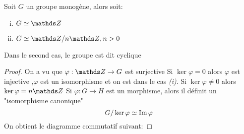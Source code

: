 	\begin{proposition}
		Soit $G$ un groupe monog\`ene, alors soit:
		\begin{enumerate}[(i)]
			\item	$G \simeq \Set{Z}$
			\item	$G \simeq \Set{Z} / n\Set{Z} , n > 0$
		\end{enumerate}
	\end{proposition}
	\begin{definition}
		Dans le second cas, le groupe est dit cyclique
	\end{definition}
	\begin{proof}
		On a vu que $\varphi : \Set{Z} \rightarrow G$ est surjective \newline
		Si $\ker \varphi = 0$ alors $\varphi$ est injective ,$\varphi$ est un isomorphisme et on est dans le cas \textit{(i)}. \newline
		Si $\ker \varphi \ne 0$ alors $\ker \varphi = n\Set{Z}$ \newline
		 \newline
		 Si $\varphi : G \rightarrow H$ est un morphisme, alors il d\'efinit un "isomorphisme canonique"
		\[ G/ \ker \varphi \simeq {\text{Im\,}} \varphi \]
		On obtient le diagramme commutatif suivant:
		
	\end{proof}	
